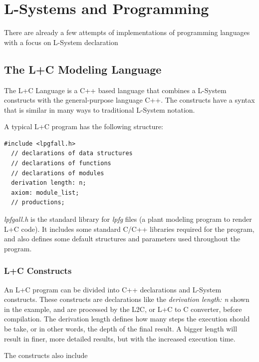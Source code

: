 \documentclass{acmtog}
\begin{document}
\section{L-Systems and Programming}
\label{sec:languages}

There are already a few attempts of implementations of programming languages with a focus on L-System declaration

\subsection{The L+C Modeling Language}
\label{subsec:lc_language}

The L+C Language \cite{karwowski2003design} is a C++ based language that combines a L-System constructs with the general-purpose language C++. The constructs have a syntax that is similar in many ways to traditional L-System notation.

A typical L+C program has the following structure:

\begin{lstlisting}[label={lst:lc_example}]
  #include <lpgfall.h>
  // declarations of data structures
  // declarations of functions
  // declarations of modules
  derivation length: n;
  axiom: module_list;
  // productions;
\end{lstlisting}

\emph{lpfgall.h} is the standard library for \emph{lpfg} files (a plant modeling program to render L+C code). It includes some standard C/C++ libraries required for the program, and also defines some default structures and parameters used throughout the program.

\subsubsection{L+C Constructs}
\label{subsubsec:constructs}

An L+C program can be divided into C++ declarations and L-System constructs. These constructs are declarations like the \emph{derivation length: n} shown in the example, and are processed by the L2C, or L+C to C converter, before compilation. The derivation length defines how many steps the execution should be take, or in other words, the depth of the final result. A bigger length will result in finer, more detailed results, but with the increased execution time.

The constructs also include
\end{document}
